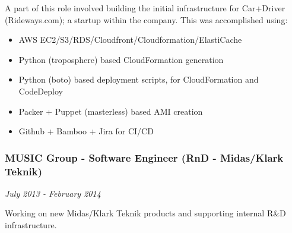 A part of this role involved building the initial infrastructure for
Car+Driver (Rideways.com); a startup within the company. This was
accomplished using:

\begin{itemize}
\tightlist
\item
  AWS EC2/S3/RDS/Cloudfront/Cloudformation/ElastiCache
\item
  Python (troposphere) based CloudFormation generation
\item
  Python (boto) based deployment scripts, for CloudFormation and
  CodeDeploy
\item
  Packer + Puppet (masterless) based AMI creation
\item
  Github + Bamboo + Jira for CI/CD
\end{itemize}

\subsubsection{MUSIC Group - Software Engineer (RnD - Midas/Klark
Teknik)}\label{music-group---software-engineer-rnd---midasklark-teknik}

\emph{July 2013 - February 2014}

Working on new Midas/Klark Teknik products and supporting internal R\&D
infrastructure.

